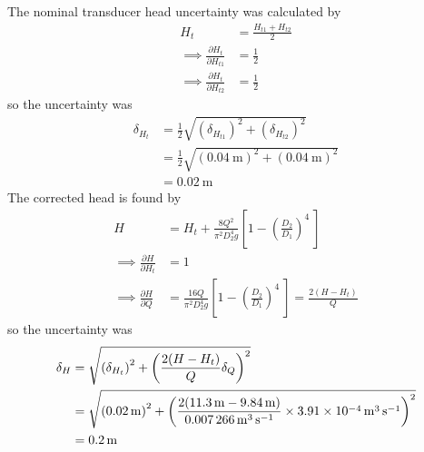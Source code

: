 The nominal transducer head uncertainty was calculated by
\begin{align*}
    H_t &= \frac{H_{t1} + H_{t2}}{2} \\
    \implies \frac{\partial H_t}{\partial H_{t1}} &= \frac{1}{2} \\
    \implies \frac{\partial H_t}{\partial H_{t2}} &= \frac{1}{2} 
\end{align*}
so the uncertainty was
\begin{align*}
    \delta_{H_t} &= \frac{1}{2} \sqrt{\left(\delta_{H_{t1}}\right)^2 + \left(\delta_{H_{t2}}\right)^2} \\
    &= \frac{1}{2} \sqrt{\left(\qty{0.04}{\meter}\right)^2 + \left(\qty{0.04}{\meter}\right)^2} \\
    &= \qty{0.02}{\meter}
\end{align*}
The corrected head is found by
\begin{align*}
    H &= H_t + \frac{8Q^2}{\pi^2 D_2^4 g} \left[1 - \left(\frac{D_2}{D_1}\right)^4\ \right] \\
    \implies \frac{\partial H}{\partial H_t} &= 1 \\
    \implies \frac{\partial H}{\partial Q} &= \frac{16Q}{\pi^2 D_2^4 g} \left[1 - \left(\frac{D_2}{D_1}\right)^4\ \right] = \frac{2(H - H_t)}{Q} 
\end{align*}
so the uncertainty was
\begin{align*}
    \delta_H &= \sqrt{\left(\delta_{H_t}\right)^2 + \left(\frac{2(H - H_t)}{Q}\delta_Q\right)^2} \\
    &= \sqrt{\left(\qty{0.02}{\meter}\right)^2 + \left(\frac{2(\qty{11.3}{\meter} - \qty{9.84}{\meter})}{\qty{0.007266}{\meter\cubed\per\second}} \times \qty{3.91E-04}{\meter\cubed\per\second}\right)^2} \\
    &= \qty{0.2}{\meter}
\end{align*}


